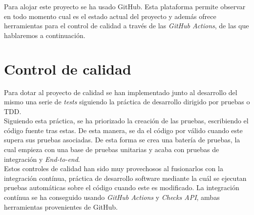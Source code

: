 Para alojar este proyecto se ha usado GitHub. Esta plataforma permite observar en todo momento cual es el estado actual del proyecto y además ofrece herramientas para el control de calidad
a través de las \textit{GitHub Actions}, de las que hablaremos a continuación.


\section {Control de calidad}

Para dotar al proyecto de calidad se han implementado junto al desarrollo del mismo una serie de \textit{tests} siguiendo la práctica de desarrollo dirigido por pruebas o TDD.\\

Siguiendo esta práctica, se ha priorizado la creación de las pruebas, escribiendo el código fuente tras estas. De esta manera, se da el código por válido cuando este supera sus pruebas asociadas.
De esta forma se crea una batería de pruebas, la cual empieza con una base de pruebas unitarias y acaba con pruebas de integración y \textit{End-to-end}.\\

Estos controles de calidad han sido muy provechosos al fusionarlos con la integración contínua, práctica de desarrollo software mediante la cuál se ejecutan pruebas automáticas sobre el código cuando este es modificado.
La integración contínua se ha conseguido usando \textit{GitHub Actions} y \textit{Checks API}, ambas herramientas provenientes de GitHub.